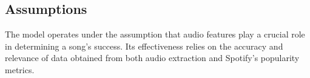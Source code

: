\documentclass[11pt]{report}
\begin{document}
 \subsection{Assumptions}
 The model operates under the assumption that audio features play a crucial role in determining a song's success. Its effectiveness relies on the accuracy and relevance of data obtained from both audio extraction and Spotify's popularity metrics.

\newpage





\end{document}

